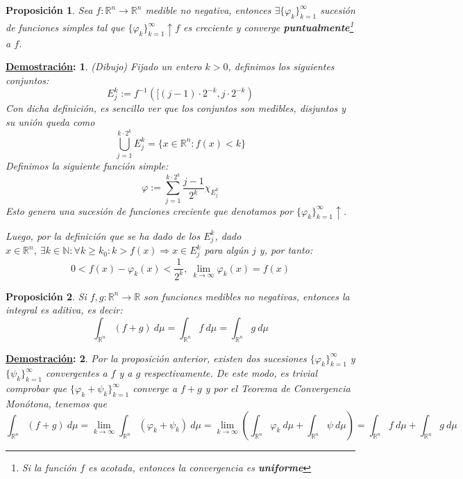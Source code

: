 \documentclass[10pt,a4paper,openright]{book}
\theoremstyle{break}
\newtheorem*{prop}{Proposición}
\newtheorem*{demo}{\underline{Demostración}:}
\newcommand{\dif}[1]{\ d#1}
\begin{document}
\begin{prop}
Sea $f: \mathbb{R}^n \rightarrow \mathbb{R}^n$ medible no negativa, entonces $\exists \{\varphi_k\}_{k=1}^{\infty}$ sucesión de funciones simples tal que $\{\varphi_k\}_{k=1}^\infty \uparrow f $ es creciente y converge \textbf{puntualmente}\footnote{Si la función $f$ es acotada, entonces la convergencia es \textbf{uniforme}} a $f$.
\end{prop}
\begin{demo}
(\textit{Dibujo}) 
Fijado un entero $k> 0$, definimos los siguientes conjuntos:
$$E_j^k := f^{-1}\left([(j-1)\cdot 2^{-k}, j\cdot 2^{-k}\right)$$
Con dicha definición, es sencillo ver que los conjuntos son medibles, disjuntos y su unión queda como
$$\bigcup_{j=1}^{k\cdot 2^k}E_j^k = \{x\in  \mathbb{R}^n: f(x) < k\}$$
Definimos la siguiente función simple:
$$\varphi := \sum_{j=1}^{k\cdot 2^k} \frac{j-1}{2^k} \chi_{E_j^k}$$
Esto genera una sucesión de funciones creciente que denotamos por $\{\varphi_k\}_{k=1}^\infty \uparrow$.

Luego, por la definición que se ha dado de los $E_j^k$, dado $x \in \mathbb{R}^n,\ \exists k\in \mathbb{N} : \forall k \ge k_0: k > f\left(x\right) \Rightarrow x \in E_j^k$ para algún $j $ y, por tanto:
$$0 < f\left(x \right) - \varphi_k \left(x\right) < \frac{1}{2^k},\ \lim_{k \rightarrow \infty} \varphi_k\left(x\right) = f\left(x\right) $$
\end{demo}

\begin{prop}
Si $f, g: \mathbb{R}^n \rightarrow \mathbb{R}$ son funciones medibles no negativas, entonces la integral es aditiva, es decir:
$$\int_{\mathbb{R}^n} \left(f + g\right) \dif{\mu} = \int_{\mathbb{R}^n} f \dif{\mu} = \int_{\mathbb{R}^n} g \dif{\mu}$$
\end{prop}
\begin{demo}
Por la proposición anterior, existen dos sucesiones $\{\varphi_k\}_{k=1}^\infty$ y $\{\psi_k\}_{k=1}^\infty$ convergentes a $f$ y a $g$ respectivamente. De este modo, es trivial comprobar que $\{\varphi_k + \psi_k\}_{k=1}^\infty$ converge a $f+g$ y por el Teorema de Convergencia Monótona, tenemos que
$$\int_{\mathbb{R}^n}(f+g) \dif{\mu} = \lim_{k\rightarrow\infty} \int_{\mathbb{R}^n}(\varphi_k + \psi_k) \dif{\mu} = \lim_{k \rightarrow \infty} \left( \int_{\mathbb{R}^n} \varphi_k \dif{\mu} + \int_{\mathbb{R}^n} \psi \dif{\mu} \right) = \int_{\mathbb{R}^n} f \dif{\mu} + \int_{\mathbb{R}^n} g \dif{\mu}$$
\end{demo}
\end{document}
